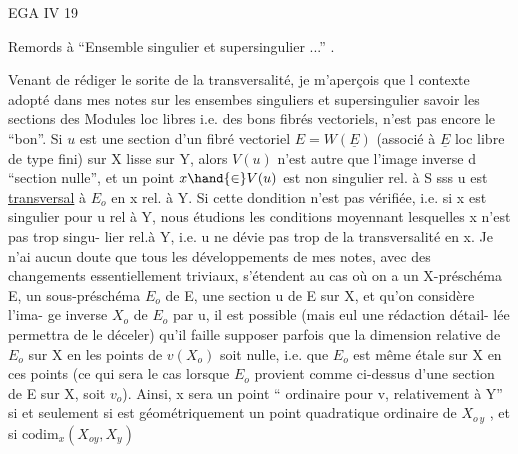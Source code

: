 
EGA IV 19

Remords à ``Ensemble singulier et supersingulier ...'' .

Venant de rédiger le sorite de la transversalité, je m'aperçois que l
contexte adopté dans mes notes sur les ensembes singuliers et supersingulier
savoir les sections des Modules loc libres i.e. des bons fibrés vectoriels,
n'est pas encore le ``bon''. Si $u$ est une section d'un fibré vectoriel
$E = W(\underline{E})$ (associé à $\underline{E}$ loc libre de type fini) sur X lisse sur Y, alors $V(u)$
n'est autre que l'image inverse d   ``section nulle'', et un point $x\hand{\in} V(u)$
est non singulier  rel. à S sss u est \uline{transversal} à $E_{o}$ en x rel. à Y.
Si cette dondition n'est pas vérifiée, i.e. si x est singulier pour u rel à
Y, nous étudions les conditions moyennant lesquelles x n'est pas trop singu-%
lier rel.à Y, i.e. u ne dévie pas trop de la transversalité en x. Je n'ai
aucun doute que tous les développements de mes notes, avec des changements
essentiellement triviaux, s'étendent au cas où on a un X-préschéma E, un
sous-préschéma $E_{o}$ de E, une section  u de E sur X, et qu'on considère l'ima-%
ge inverse $X_{o}$ de $E_{o}$ par u,  il est possible (mais eul une rédaction détail-%
lée permettra de le déceler) qu'il faille supposer parfois que la dimension
relative de $E_{o}$ sur X en les points de $v(X_{o})$ soit nulle, i.e. que $E_{o}$ est
même étale sur X en ces points (ce qui sera le cas lorsque $E_{o}$ provient comme
ci-dessus d'une section de E sur X, soit $v_{o}$). Ainsi, x sera un point
``  ordinaire pour v, relativement à Y'' si et seulement si    est
géométriquement un point quadratique ordinaire de $X_{o\,y}$ , et si $\mathrm{codim}_{x}(X_{oy},X_{y})$
